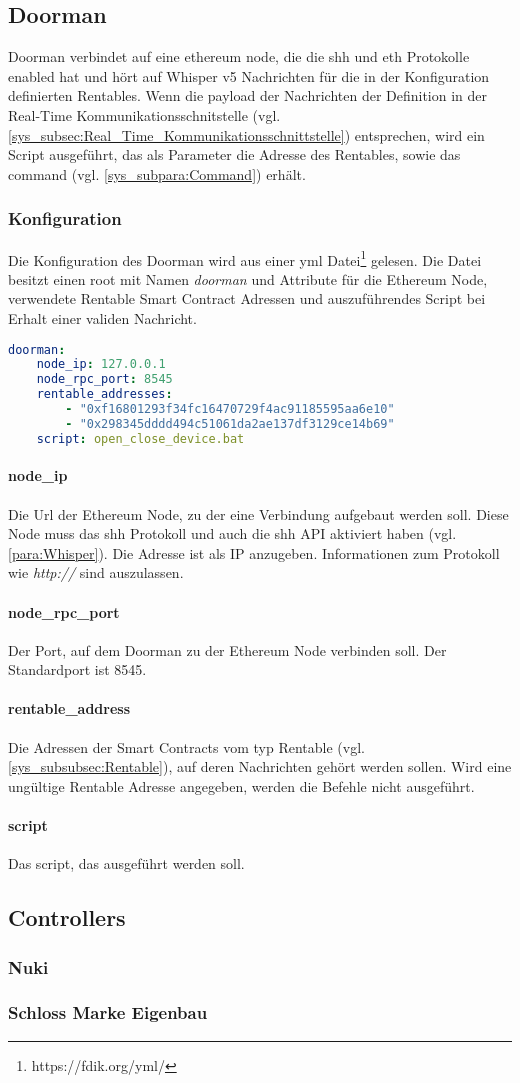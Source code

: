 \subsection{Doorman}
Doorman verbindet auf eine ethereum node, die die shh und eth Protokolle enabled hat und hört auf Whisper v5 Nachrichten für die in der Konfiguration definierten Rentables. Wenn die payload der Nachrichten der Definition in der Real-Time Kommunikationsschnitstelle (vgl. \ref{sys_subsec:Real_Time_Kommunikationsschnittstelle}) entsprechen, wird ein Script ausgeführt, das als Parameter die Adresse des Rentables, sowie das command (vgl. \ref{sys_subpara:Command}) erhält.

\subsubsection{Konfiguration}
\label{sys_subsec:Doorman_Konfiguration}
Die Konfiguration des Doorman wird aus einer yml Datei\footnote{https://fdik.org/yml/} gelesen. Die Datei besitzt einen root mit Namen \emph{doorman} und Attribute für die Ethereum Node, verwendete Rentable Smart Contract Adressen und auszuführendes Script bei Erhalt einer validen Nachricht.
\begin{lstlisting}[language=yml,caption={Beispielkonfiguration für Doorman}]
doorman:
    node_ip: 127.0.0.1
    node_rpc_port: 8545
    rentable_addresses:
        - "0xf16801293f34fc16470729f4ac91185595aa6e10"
        - "0x298345dddd494c51061da2ae137df3129ce14b69"
    script: open_close_device.bat
\end{lstlisting}

\paragraph{node\_ip}
Die Url der Ethereum Node, zu der eine Verbindung aufgebaut werden soll. Diese Node muss das shh Protokoll und auch die shh API aktiviert haben (vgl. \ref{para:Whisper}). Die Adresse ist als IP anzugeben. Informationen zum Protokoll wie \emph{http://} sind auszulassen.
\paragraph{node\_rpc\_port}
Der Port, auf dem Doorman zu der Ethereum Node verbinden soll. Der Standardport ist 8545.
\paragraph{rentable\_address}
Die Adressen der Smart Contracts vom typ Rentable (vgl. \ref{sys_subsubsec:Rentable}), auf deren Nachrichten gehört werden sollen. Wird eine ungültige Rentable Adresse angegeben, werden die Befehle nicht ausgeführt.
\paragraph{script}
Das script, das ausgeführt werden soll.

\subsection{Controllers}
\subsubsection{Nuki}
\subsubsection{Schloss Marke Eigenbau}
